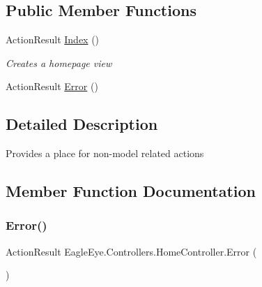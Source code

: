 \subsection*{Public Member Functions}
\begin{DoxyCompactItemize}
\item 
Action\+Result \mbox{\hyperlink{class_eagle_eye_1_1_controllers_1_1_home_controller_a514cfcd727b9415f4918ee62072b1259}{Index}} ()
\begin{DoxyCompactList}\small\item\em Creates a homepage view \end{DoxyCompactList}\item 
Action\+Result \mbox{\hyperlink{class_eagle_eye_1_1_controllers_1_1_home_controller_a89ae6f15dd2e158c396a7af8cc4a5d2a}{Error}} ()
\end{DoxyCompactItemize}


\subsection{Detailed Description}
Provides a place for non-\/model related actions 



\subsection{Member Function Documentation}
\mbox{\label{class_eagle_eye_1_1_controllers_1_1_home_controller_a89ae6f15dd2e158c396a7af8cc4a5d2a}} 
\subsubsection{\texorpdfstring{Error()}{Error()}}
{\footnotesize\ttfamily Action\+Result Eagle\+Eye.\+Controllers.\+Home\+Controller.\+Error (\begin{DoxyParamCaption}{ }\end{DoxyParamCaption})}

\mbox{\label{class_eagle_eye_1_1_controllers_1_1_home_controller_a514cfcd727b9415f4918ee62072b1259}} 
